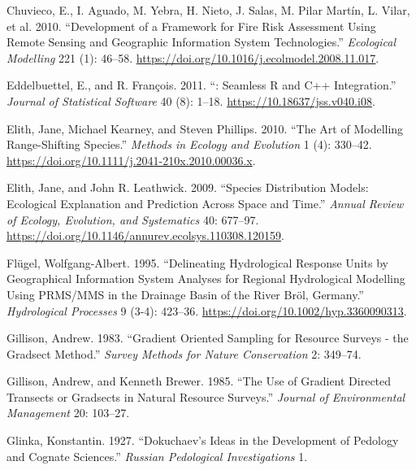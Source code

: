 \begin{CSLReferences}{1}{0}
\leavevmode{}%
Chuvieco, E., I. Aguado, M. Yebra, H. Nieto, J. Salas, M. Pilar Martín, L. Vilar, et al. 2010. {``Development of a Framework for Fire Risk Assessment Using Remote Sensing and Geographic Information System Technologies.''} \emph{Ecological Modelling} 221 (1): 46--58. \url{https://doi.org/10.1016/j.ecolmodel.2008.11.017}.

\leavevmode{}%
Eddelbuettel, E., and R. François. 2011. {``: Seamless {R} and {C++} Integration.''} \emph{Journal of Statistical Software} 40 (8): 1--18. \url{https://10.18637/jss.v040.i08}.

\leavevmode{}%
Elith, Jane, Michael Kearney, and Steven Phillips. 2010. {``The Art of Modelling Range-Shifting Species.''} \emph{Methods in Ecology and Evolution} 1 (4): 330--42. \url{https://doi.org/10.1111/j.2041-210x.2010.00036.x}.

\leavevmode{}%
Elith, Jane, and John R. Leathwick. 2009. {``Species Distribution Models: Ecological Explanation and Prediction Across Space and Time.''} \emph{Annual Review of Ecology, Evolution, and Systematics} 40: 677--97. \url{https://doi.org/10.1146/annurev.ecolsys.110308.120159}.

\leavevmode{}%
Flügel, Wolfgang-Albert. 1995. {``Delineating Hydrological Response Units by Geographical Information System Analyses for Regional Hydrological Modelling Using {PRMS/MMS} in the Drainage Basin of the River {B}r{ö}l, {G}ermany.''} \emph{Hydrological Processes} 9 (3-4): 423--36. \url{https://doi.org/10.1002/hyp.3360090313}.

\leavevmode{}%
Gillison, Andrew. 1983. {``Gradient Oriented Sampling for Resource Surveys{ - }the Gradsect Method.''} \emph{Survey Methods for Nature Conservation} 2: 349--74.

\leavevmode{}%
Gillison, Andrew, and Kenneth Brewer. 1985. {``The Use of Gradient Directed Transects or Gradsects in Natural Resource Surveys.''} \emph{Journal of Environmental Management} 20: 103--27.

\leavevmode{}%
Glinka, Konstantin. 1927. {``Dokuchaev{'}s Ideas in the Development of Pedology and Cognate Sciences.''} \emph{Russian Pedological Investigations} 1.


\end{CSLReferences}
